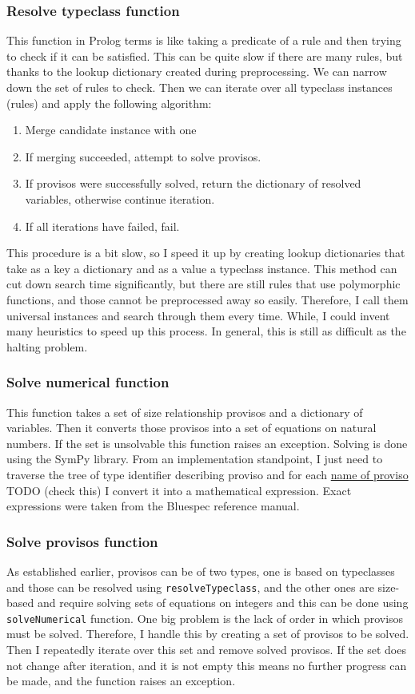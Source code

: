 \documentclass[12pt]{report}
\begin{document}
\subsubsection{Resolve typeclass function}
This function in Prolog terms is like taking a predicate of a rule and then trying to check if it can be satisfied. This can be quite slow if there are many rules, but thanks to the lookup dictionary created during preprocessing. We can narrow down the set of rules to check. 
Then we can iterate over all typeclass instances (rules) and apply the following algorithm: 
\begin{enumerate}  
   \item Merge candidate instance with one  
   \item If merging succeeded, attempt to solve provisos. 
   \item If provisos were successfully solved, return the dictionary of resolved variables, otherwise continue iteration. 
   \item If all iterations have failed, fail. 
\end{enumerate} 
This procedure is a bit slow, so I speed it up by creating lookup dictionaries that take as a key a dictionary and as a value a typeclass instance. This method can cut down search time significantly, but there are still rules that use polymorphic functions, and those cannot be preprocessed away so easily. Therefore, I call them universal instances and search through them every time. While, I could invent many heuristics to speed up this process. In general, this is still as difficult as the halting problem. 

\subsubsection{Solve numerical function} 

This function takes a set of size relationship provisos and a dictionary of variables. Then it converts those provisos into a set of equations on natural numbers. If the set is unsolvable this function raises an exception. Solving is done using the SymPy library. 
From an implementation standpoint, I just need to traverse the tree of type identifier describing proviso and for each \hyperref[sec:Provisos]{name of proviso} TODO (check this) I convert it into a mathematical expression. Exact expressions were taken from the Bluespec reference manual. 
\subsubsection{Solve provisos function} 
As established earlier, provisos can be of two types, one is based on typeclasses and those can be resolved using \verb!resolveTypeclass!, and the other ones are size-based and require solving sets of equations on integers and this can be done using \verb!solveNumerical! function. 
One big problem is the lack of order in which provisos must be solved. Therefore, I handle this by creating a set of provisos to be solved. Then I repeatedly iterate over this set and remove solved provisos. If the set does not change after iteration, and it is not empty this means no further progress can be made, and the function raises an exception. 
\end{document}
